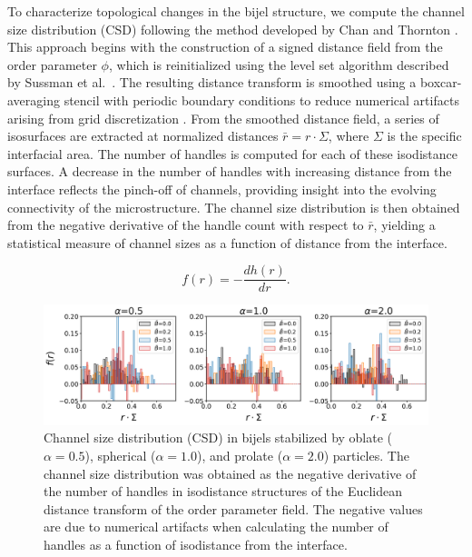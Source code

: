 
To characterize topological changes in the bijel structure, we compute the channel size distribution (CSD) following the method developed by Chan and Thornton \cite{chan_channel_2012}. This approach begins 
with the construction of a signed distance field from the order parameter \(\phi\), which is reinitialized using the level set algorithm described by Sussman et al.~\cite{sussman_level_1994, chan_channel_2012}. 
The resulting distance transform is smoothed using a boxcar-averaging stencil with periodic boundary conditions to reduce numerical artifacts arising from grid discretization \cite{chan_channel_2012}. 
From the smoothed distance field, a series of isosurfaces are extracted at normalized distances \(\bar{r} = r \cdot \Sigma\), where \(\Sigma\) is the specific interfacial area. The number of handles is computed 
for each of these isodistance surfaces. A decrease in the number of handles with increasing distance from the interface reflects the pinch-off of channels, providing insight into the evolving connectivity of the 
microstructure. The channel size distribution is then obtained from the negative derivative of the handle count with respect to \(\bar{r}\), yielding a statistical measure of channel sizes as a function of 
distance from the interface.

\begin{equation}
f(r) = - \frac{d h(r)}{dr} .
\end{equation}

\begin{figure}
\includegraphics[width=\textwidth]{../figures/results/paper1_5/CSD.png}%
\caption{Channel size distribution (CSD) in bijels stabilized by oblate ($\alpha=0.5$), spherical ($\alpha=1.0$), and prolate ($\alpha=2.0$) particles. 
         The channel size distribution was obtained as the negative derivative of the number of handles in isodistance structures of the Euclidean distance 
         transform of the order parameter field. The negative values are due to numerical artifacts when calculating the number of handles as a function of 
         isodistance from the interface.}
\label{fig:CSD}%
\end{figure}

